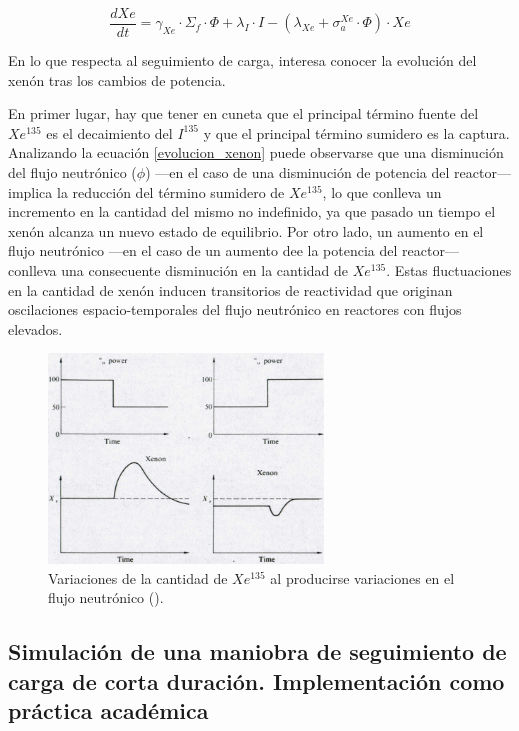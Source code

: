\begin{equation} \label{evolucion_xenon}
  \frac{d X e}{d t}=\gamma_{X e} \cdot \Sigma_f \cdot \Phi+\lambda_I \cdot I-\left(\lambda_{X e}+\sigma_a^{X e} \cdot \Phi\right) \cdot X e
\end{equation}

En lo que respecta al seguimiento de carga, interesa conocer la evolución del xenón tras los cambios de potencia. 

En primer lugar, hay que tener en cuneta que el principal término fuente del $Xe^{135}$ es el decaimiento del $I^{135}$ y que el principal término sumidero es la captura. Analizando la ecuación \ref{evolucion_xenon} puede observarse que una disminución del flujo neutrónico ($\phi$) ---en el caso de una disminución de potencia del reactor--- implica la reducción del término sumidero de  $Xe^{135}$, lo que conlleva un incremento en la cantidad del mismo no indefinido, ya que pasado un tiempo el xenón alcanza un nuevo estado de equilibrio. Por otro lado, un aumento en el flujo neutrónico ---en el caso de un aumento dee la potencia del reactor--- conlleva una consecuente disminución en la cantidad de $Xe^{135}$. Estas fluctuaciones en la cantidad de xenón inducen transitorios de reactividad que
originan oscilaciones espacio-temporales del flujo neutrónico en reactores con flujos elevados.

\begin{figure}[h]
  \centering
  \includegraphics[width=0.65\textwidth]{content/figures/variaciones_potencia_xenon.png}
  \caption{Variaciones de la cantidad de $Xe^{135}$ al producirse variaciones en el flujo neutrónico (\cite{apuntes_centrales}).}
  \label{fig:variaciones_potencia_xenon}
\end{figure}

\subsection{Simulación de una maniobra de seguimiento de carga de corta duración. Implementación como práctica académica}

